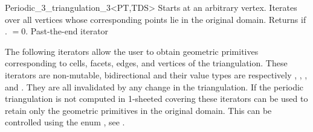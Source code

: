 \begin{ccRefClass}{Periodic_3_triangulation_3<PT,TDS>}
{Starts at an arbitrary vertex. Iterates over all vertices whose
  corresponding points lie in the original domain. Returns
   if \ccVar. $=0$.}
\ccGlue
{}
{Past-the-end iterator}

The following iterators allow the user to obtain geometric primitives
corresponding to cells, facets, edges, and vertices of the
triangulation.
These iterators are non-mutable, bidirectional and their value types
are respectively , ,
, and . They are all
invalidated by any change in the triangulation. If the periodic
triangulation is not computed in 1-sheeted covering these iterators
can be used to retain only the geometric primitives in the original
domain. This can be controlled using the enum , see
. 


\end{ccRefClass}
